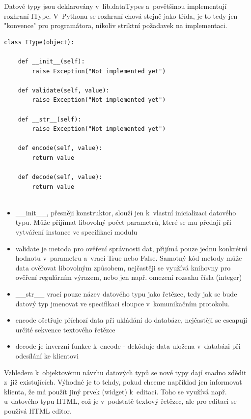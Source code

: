\documentclass[bc,male,html,dept460]{diploma}				%
\begin{document}
Datové typy jsou deklarovány v~lib.dataTypes a~povětšinou implementují rozhraní IType.
V~Pythonu se rozhraní chová stejně jako třída, je to tedy jen "konvence" pro programátora, nikoliv striktní požadavek na implementaci.

\bigskip
\begin{lstlisting}[label=src:Python,caption=Rozhraní datového typu]
class IType(object):

	def __init__(self):
		raise Exception("Not implemented yet")

	def validate(self, value):
		raise Exception("Not implemented yet")

	def __str__(self):
		raise Exception("Not implemented yet")

	def encode(self, value):
		return value

	def decode(self, value):
		return value
                
\end{lstlisting}

\begin{itemize}
\item \_\_init\_\_, přesněji konstruktor, slouží jen k~vlastní inicializaci datového typu. Může přijímat libovolný počet parametrů, které se mu předají při vytváření instance ve specifikaci modulu
\item validate je metoda pro ověření správnosti dat, přijímá pouze jednu konkrétní hodnotu v~parametru a~vrací True nebo False. Samotný kód metody může data ověřovat libovolným způsobem, nejčastěji se využívá knihovny  pro ověření regulárním výrazem, nebo jen např. omezení rozsahu čísla (integer)
\item \_\_str\_\_ vrací pouze název datového typu jako řetězec, tedy jak se bude datový typ jmenovat ve specifikaci sloupce v~komunikačním protokolu.
\item encode ošetřuje příchozí data při ukládání do databáze, nejčastěji se escapují určité sekvence textového řetězce
\item decode je inverzní funkce k~encode - dekóduje data uložena v~databázi při odesílání ke klientovi
\end{itemize}


Vzhledem k~objektovému návrhu datových typů se nové typy dají snadno zdědit z~již existujících. Výhodné je to tehdy, pokud chceme například jen informovat klienta, že má použít jiný prvek (widget) k~editaci.
Toho se využívá např. u~datového typu HTML, což je v~podstatě textový řetězec, ale pro editaci se používá HTML editor.
\end{document}
